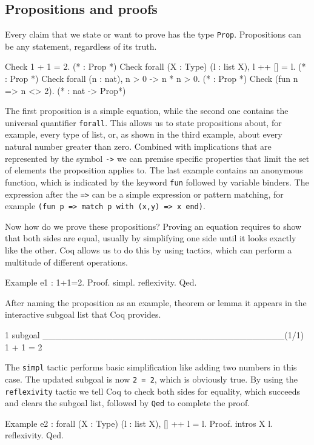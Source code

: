 \documentclass[paper = a4, fleqn, abstract=on, twoside]{scrreprt}
\newcommand{\coqinline}[1]{\texttt{#1}}
\begin{document}
\subsection{Propositions and proofs}
Every claim that we state or want to prove has the type \coqinline{Prop}. Propositions can be any statement, regardless of its truth.
\begin{coqcode}
Check 1 + 1 = 2. (* : Prop *)
Check forall (X : Type) (l : list X), l ++ [] = l. (* : Prop *)
Check forall (n : nat), n > 0 -> n * n > 0. (* : Prop *)
Check (fun n => n <> 2). (* : nat -> Prop*)
\end{coqcode}
The first proposition is a simple equation, while the second one contains the universal quantifier \coqinline{forall}. This allows us to state propositions about, for example, every type of list, or, as shown in the third example, about every natural number greater than zero. Combined with implications that are represented by the symbol \coqinline{->} we can premise specific properties that limit the set of elements the proposition applies to. The last example contains an anonymous function, which is indicated by the keyword \coqinline{fun} followed by variable binders. The expression after the \coqinline{=>} can be a simple expression or pattern matching, for example \coqinline{(fun p => match p with (x,y) => x end)}.
\par
Now how do we prove these propositions? Proving an equation requires to show that both sides are equal, usually by simplifying one side until it looks exactly like the other. Coq allows us to do this by using tactics, which can perform a multitude of different operations.
\begin{coqcode}
Example e1 : 1+1=2.
Proof. simpl. reflexivity. Qed. 
\end{coqcode} 
After naming the proposition as an example, theorem or lemma it appears in the interactive subgoal list that Coq provides.
\begin{coqcode}
1 subgoal
______________________________________(1/1)
1 + 1 = 2
\end{coqcode}
The \coqinline{simpl} tactic performs basic simplification like adding two numbers in this case. The updated subgoal is now \coqinline{2 = 2}, which is obviously true. By using the \coqinline{reflexivity} tactic we tell Coq to check both sides for equality, which succeeds and clears the subgoal list, followed by \coqinline{Qed} to complete the proof.
\begin{coqcode}
Example e2 : forall (X : Type) (l : list X), [] ++ l = l.
Proof. intros X l. reflexivity. Qed.
\end{coqcode}
\end{document}
